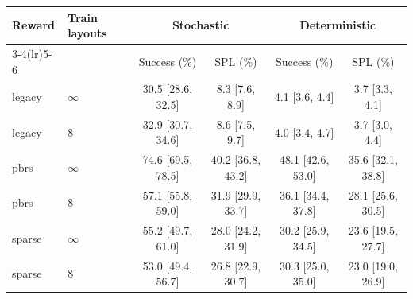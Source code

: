 \begin{tabular}{llcccc}
\toprule
Reward & Train layouts & \multicolumn{2}{c}{Stochastic} & \multicolumn{2}{c}{Deterministic} \\
\cmidrule(lr){3-4}\cmidrule(lr){5-6}
 &  & Success (\%) & SPL (\%) & Success (\%) & SPL (\%) \\
\midrule
legacy & $\infty$ & 30.5 {\scriptsize[28.6, 32.5]} & 8.3 {\scriptsize[7.6, 8.9]} & 4.1 {\scriptsize[3.6, 4.4]} & 3.7 {\scriptsize[3.3, 4.1]} \\
legacy & 8 & 32.9 {\scriptsize[30.7, 34.6]} & 8.6 {\scriptsize[7.5, 9.7]} & 4.0 {\scriptsize[3.4, 4.7]} & 3.7 {\scriptsize[3.0, 4.4]} \\
pbrs & $\infty$ & 74.6 {\scriptsize[69.5, 78.5]} & 40.2 {\scriptsize[36.8, 43.2]} & 48.1 {\scriptsize[42.6, 53.0]} & 35.6 {\scriptsize[32.1, 38.8]} \\
pbrs & 8 & 57.1 {\scriptsize[55.8, 59.0]} & 31.9 {\scriptsize[29.9, 33.7]} & 36.1 {\scriptsize[34.4, 37.8]} & 28.1 {\scriptsize[25.6, 30.5]} \\
sparse & $\infty$ & 55.2 {\scriptsize[49.7, 61.0]} & 28.0 {\scriptsize[24.2, 31.9]} & 30.2 {\scriptsize[25.9, 34.5]} & 23.6 {\scriptsize[19.5, 27.7]} \\
sparse & 8 & 53.0 {\scriptsize[49.4, 56.7]} & 26.8 {\scriptsize[22.9, 30.7]} & 30.3 {\scriptsize[25.0, 35.0]} & 23.0 {\scriptsize[19.0, 26.9]} \\
\bottomrule
\end{tabular}
